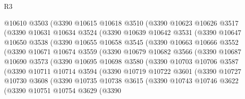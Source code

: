 \begin{lexlean}{R3}
\begin{coremodule}
          @10610
          @3503
          (@3390
            @10615
            @10618
            @3510
            (@3390
              @10623
              @10626
              @3517
              (@3390
                @10631
                @10634
                @3524
                (@3390
                  @10639
                  @10642
                  @3531
                  (@3390
                    @10647
                    @10650
                    @3538
                    (@3390
                      @10655
                      @10658
                      @3545
                      (@3390
                        @10663
                        @10666
                        @3552
                        (@3390
                          @10671
                          @10674
                          @3559
                          (@3390
                            @10679
                            @10682
                            @3566
                            (@3390
                              @10687
                              @10690
                              @3573
                              (@3390
                                @10695
                                @10698
                                @3580
                                (@3390
                                  @10703
                                  @10706
                                  @3587
                                  (@3390
                                    @10711
                                    @10714
                                    @3594
                                    (@3390
                                      @10719
                                      @10722
                                      @3601
                                      (@3390
                                        @10727
                                        @10730
                                        @3608
                                        (@3390
                                          @10735
                                          @10738
                                          @3615
                                          (@3390
                                            @10743
                                            @10746
                                            @3622
                                            (@3390
                                              @10751
                                              @10754
                                              @3629
                                              (@3390

\end{coremodule}
\end{lexlean}
